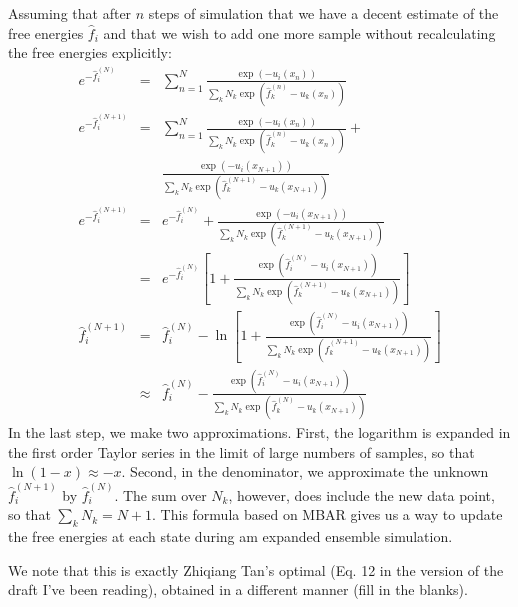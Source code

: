 \documentclass[superscriptaddress,showkeys, nofootinbib, pre, aps]{revtex4-1}
\begin{document}
Assuming that after $n$ steps of simulation that we have a decent estimate of the free energies $\hat{f}_{i}$ and that we wish to add one more sample without recalculating the free energies explicitly:
\begin{eqnarray}
e^{-\hat{f}_{i}^{(N)}} &=& \sum_{n=1}^N \frac{\exp(-u_i(x_n))}{\sum\limits_k N_k \exp(\hat{f}_{k}^{(n)}-u_k(x_n))} \nonumber \\
e^{-\hat{f}_{i}^{(N+1)}} &=& \sum_{n=1}^N \frac{\exp(-u_i(x_n))}{\sum\limits_k N_k \exp(\hat{f}_{k}^{(n)}-u_k(x_n))} +  \nonumber \\
                          & & \frac{\exp(-u_i(x_{N+1}))}{\sum\limits_k N_k \exp(\hat{f}_{k}^{(N+1)}-u_k(x_{N+1}))}  \nonumber \\
e^{-\hat{f}_{i}^{(N+1)}} &=& e^{-\hat{f}_{i}^{(N)}} + \frac{\exp(-u_i(x_{N+1}))}{\sum_k N_k \exp(\hat{f}_{k}^{(N+1)}-u_k(x_{N+1}))} \nonumber \\
   &=& e^{-\hat{f}_{i}^{(N)}} \left[1 + \frac{\exp(\hat{f}_{i}^{(N)}-u_i(x_{N+1}))}{\sum_k N_k \exp(\hat{f}_{k}^{(N+1)}-u_k(x_{N+1}))}\right] \nonumber \\
\hat{f}_{i}^{(N+1)} &=& \hat{f}_{i}^{(N)} - \ln\left[1 + \frac{\exp(\hat{f}_{i}^{(N)}-u_i(x_{N+1}))}{\sum_k N_k \exp(\hat{f}_{k}^{(N+1)}-u_k(x_{N+1}))}\right] \nonumber \\
                   &\approx& \hat{f}_{i}^{(N)}- \frac{\exp(\hat{f}_{i}^{(N)}-u_i(x_{N+1}))}{\sum_k N_k \exp(\hat{f}_{k}^{(N)}-u_k(x_{N+1}))}
\end{eqnarray}
In the last step, we make two approximations.  First, the logarithm is expanded in the first order Taylor series in the limit of large numbers of samples, so that $\ln (1-x) \approx -x$.   Second, in the denominator, we approximate the unknown $\hat{f}_{i}^{(N+1)}$ by $\hat{f}_{i}^{(N)}$.  The sum over $N_k$, however, does include the new data point, so that $\sum_k N_k = N+1$.
This formula based on MBAR gives us a way to update the free energies at each state during am expanded ensemble simulation.

We note that this is exactly Zhiqiang Tan's optimal (Eq. 12 in the version of the draft I've been reading), obtained in a different manner (fill in the blanks).

\end{document}
